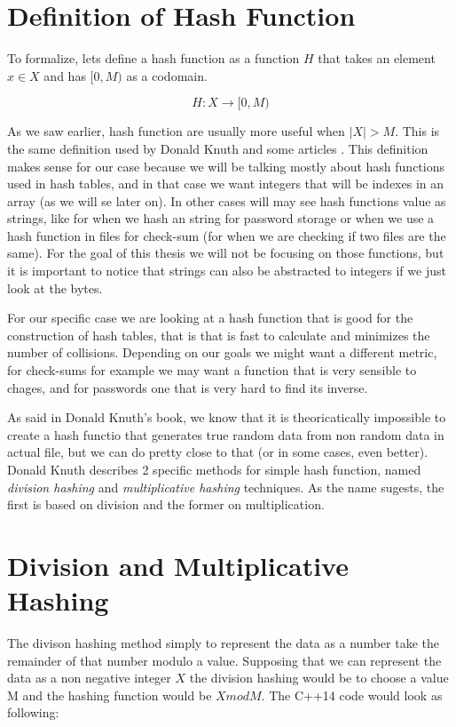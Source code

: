 \bigskip

\section{Definition of Hash Function}

To formalize, lets define a hash function as a function \( H \) that takes an element \( x \in X \) and has \( [0, M) \) as a codomain.

\[ H: X \rightarrow [0, M) \]

As we saw earlier, hash function are usually more useful when \( |X| > M \). This is the same definition used by Donald Knuth \cite{TAOCP3} and some articles \cite{RobinHoodHashing}. This definition makes sense for our case because we will be talking mostly about hash functions used in hash tables, and in that case we want integers that will be indexes in an array (as we will se later on). In other cases will may see hash functions value as strings, like for when we hash an string for password storage or when we use a hash function in files for check-sum (for when we are checking if two files are the same). For the goal of this thesis we will not be focusing on those functions, but it is important to notice that strings can also be abstracted to integers if we just look at the bytes.

For our specific case we are looking at a hash function that is good for the construction of hash tables, that is that is fast to calculate and minimizes the number of collisions. Depending on our goals we might want a different metric, for check-sums for example we may want a function that is very sensible to chages, and for passwords one that is very hard to find its inverse.

As said in Donald Knuth's book, we know that it is theoricatically impossible to create a hash functio that generates true random data from non random data in actual file, but we can do pretty close to that (or in some cases, even better).  Donald Knuth describes 2 specific methods for simple hash function, named \textit{division hashing} and \textit{multiplicative hashing} techniques. As the name sugests, the first is based on division and the former on multiplication.

\section{Division and Multiplicative Hashing}

The divison hashing method simply to represent the data as a number take the remainder of that number modulo a value. Supposing that we can represent the data as a non negative integer \( X \) the division hashing would be to choose a value M and the hashing function would be \( X mod M \). The C++14 code would look as following:


